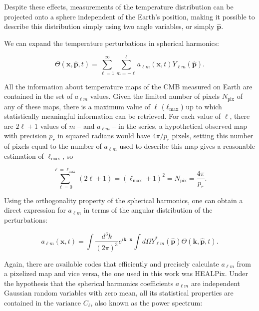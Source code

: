 \documentclass[openany,a4paper,12pt,oneside]{book}
\begin{document}
\begin{spacing}{1.5}
Despite these effects, measurements of the temperature distribution can be projected onto a sphere independent of the Earth's position, making it possible to describe this distribution simply using two angle variables, or simply $\hat{\mathbf{p}}$.

We can expand the temperature perturbations in spherical harmonics:

\begin{equation}\label{ch2:Theta_spherical harmonics}
    \Theta(\mathbf{x}, \hat{\mathbf{p}}, t)=\sum_{\ell=1}^\infty \sum_{m=-\ell}^\ell a_{\ell m}(\mathbf{x}, t)Y_{\ell m}(\hat{\mathbf{p}}).
\end{equation}

All the information about temperature maps of the CMB measured on Earth are contained in the set of $a_{\ell m}$ values. Given the limited number of pixels $N_\text{pix}$ of any of these maps, there is a maximum value of $\ell$ ($\ell_\text{max}$) up to which statistically meaningful information can be retrieved. For each value of $\ell$, there are $2\ell+1$ values of $m$ -- and $a_{\ell m}$ -- in the series, a hypothetical observed map with precision $p_r$ in squared radians would have $4\pi/p_r$ pixels, setting this number of pixels equal to the number of $a_{\ell m}$ used to describe this map gives a reasonable estimation of $\ell_\text{max}$\cite{dodelson2020modern}, so %

\begin{equation}\label{Npix}
    \sum_{\ell=0}^{\ell=\ell_\text{max}}(2\ell+1)=(\ell_\text{max}+1)^2=N_\text{pix}=\frac{4\pi}{p_r}.
\end{equation}

Using the orthogonality property of the spherical harmonics, one can obtain a direct expression for $a_{\ell m}$ in terms of the angular distribution of the perturbations:

\begin{equation}\label{ch2:alm=int...}
    a_{\ell m}(\mathbf{x}, t)=\int \frac{d^3k}{(2\pi)^3}e^{i\mathbf{k}\cdot\mathbf{x}}\int d\Omega Y_{\ell m}^*(\hat{\mathbf{p}})\Theta(\mathbf{k}, \hat{\mathbf{p}}, t).
\end{equation}

Again, there are available codes that efficiently and precisely calculate $a_{\ell m}$ from a pixelized map and vice versa, the one used in this work was HEALPix\cite{Healpix}. Under the hypothesis that the spherical harmonics coefficients $a_{\ell m}$ are independent Gaussian random variables with zero mean, all its statistical properties are contained in the variance $C_\ell$, also known as the power spectrum:


\end{spacing}
\end{document}
